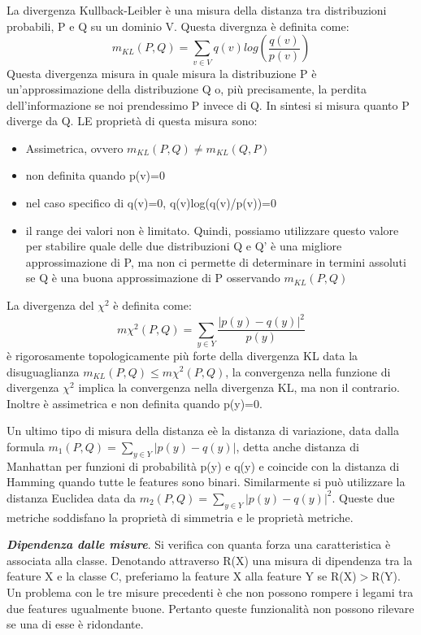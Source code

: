 \documentclass[a4paper]{extarticle}
\begin{document}
La divergenza Kullback-Leibler è una misura della distanza tra distribuzioni probabili, P e Q su un dominio V. Questa divergnza è definita come:
\begin{equation}
m_{KL}(P,Q)= \sum_{v\in V} q(v)log(\frac {q(v)}{p(v)})
\end{equation}
Questa divergenza misura in quale misura la distribuzione P è un'approssimazione della distribuzione Q o, più precisamente, la perdita dell'informazione se noi prendessimo P invece di Q. In sintesi si misura quanto P diverge da Q. LE proprietà di questa misura sono:
\begin{itemize}
\item Assimetrica, ovvero $m_{KL}(P,Q) \not = m_{KL}(Q,P)$
\item non definita quando p(v)=0
\item nel caso specifico di q(v)=0, q(v)log(q(v)/p(v))=0
\item il range dei valori non è limitato. Quindi, possiamo utilizzare questo valore per stabilire quale delle due distribuzioni Q e Q' è una migliore approssimazione di P, ma non ci permette di determinare in termini assoluti se Q è una buona approssimazione di P osservando $m_{KL}(P,Q)$
\end{itemize} 

La divergenza del $\chi ^2$ è definita come:
\begin{equation}
m \chi ^2(P,Q) = \sum_{y \in Y} \frac{|p(y)-q(y)|^2}{p(y)}
\end{equation}
è rigorosamente topologicamente più forte della divergenza KL data la disuguaglianza $m_{KL}(P,Q) \leq m \chi ^2 (P,Q)$, la convergenza nella funzione di divergenza $\chi ^2$ implica la convergenza nella divergenza KL, ma non il contrario. Inoltre è assimetrica e non definita quando p(y)=0.

Un ultimo tipo di misura della distanza eè la distanza di variazione, data dalla formula $m_1 (P,Q)= \sum_{y \in Y}|p(y)-q(y)|$, detta anche distanza di Manhattan per funzioni di probabilità p(y) e q(y) e coincide con la distanza di Hamming quando tutte le features sono binari. Similarmente si può utilizzare la distanza Euclidea data da $m_2 (P,Q)= \sum_{y \in Y} |p(y)-q(y)|^2$. Queste due metriche soddisfano la proprietà di simmetria e le proprietà metriche.

\textbf{\textit{Dipendenza dalle misure}}. Si verifica con quanta forza una caratteristica è associata alla classe. Denotando attraverso R(X) una misura di dipendenza tra la feature X e la classe C, preferiamo la feature X alla feature Y se R(X)$>$R(Y). Un problema con le tre misure precedenti è che non possono rompere i legami tra due features ugualmente buone. Pertanto queste funzionalità non possono rilevare se una di esse è ridondante.
\end{document}
